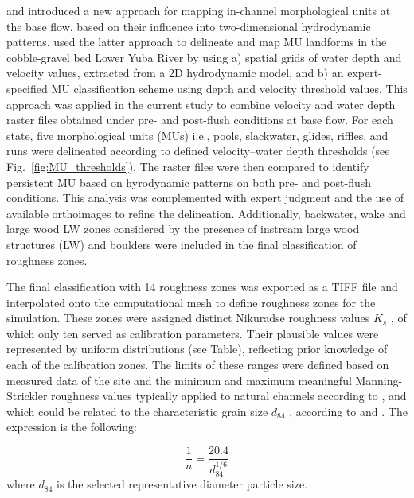 \documentclass[draft,linenumbers,onecolumn]{agujournal2019} %
\begin{document}
 and  introduced a new approach for mapping in-channel morphological units at the base flow, based on their influence into two-dimensional hydrodynamic patterns.  used the latter approach to delineate and map MU landforms in the cobble-gravel bed Lower Yuba River by using a) spatial grids of water depth and velocity values, extracted from a 2D hydrodynamic model, and b) an expert-specified MU classification scheme using depth and velocity threshold values. This approach was applied in the current study to combine velocity and water depth raster files obtained under pre- and post-flush conditions at base flow. For each state, five morphological units (MUs) i.e., pools, slackwater, glides, riffles, and runs were delineated according to defined velocity–water depth thresholds (see Fig.~\ref{fig:MU_thresholds}). The raster files were then compared to identify persistent MU based on hyrodynamic patterns on both pre- and post-flush conditions. This analysis was complemented with expert judgment and the use of available orthoimages to refine the delineation. Additionally, backwater, wake and large wood LW zones considered by the presence of instream large wood structures (LW) and boulders were included in the final classification of roughness zones.    

The final classification with 14 roughness zones was exported as a TIFF file and interpolated onto the computational mesh to define roughness zones for the simulation. These zones were assigned distinct Nikuradse roughness values \( K_s \) , of which only ten served as calibration parameters. Their plausible values were represented by uniform distributions (see Table), reflecting prior knowledge of each of the calibration zones. The limits of these ranges were defined based on measured data of the site and the minimum and maximum meaningful Manning-Strickler roughness values typically applied to natural channels according to \cite{chow1959openchannel}, and which could be related to the characteristic grain size \(d_{84}\) , according to  and . The expression is the following: 

\begin{equation}
	\frac{1}{n} = \frac{20.4}{d_{84}^{1/6}}
	\label{eq:roughness}
\end{equation}
where \( d_{84} \) is the selected representative diameter particle size. 
\end{document}
